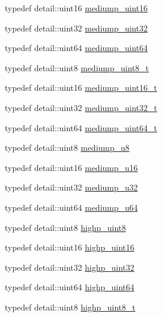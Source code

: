 \begin{DoxyCompactItemize}
typedef detail\+::uint16 \hyperlink{group__gtc__type__precision_ga2cef3a0d7b0fce75c9885f64656d8933}{mediump\+\_\+uint16}
\item 
typedef detail\+::uint32 \hyperlink{group__gtc__type__precision_ga861dbd1051f488e425b3966001b568e5}{mediump\+\_\+uint32}
\item 
typedef detail\+::uint64 \hyperlink{group__gtc__type__precision_ga6685788d15d0a973ee7c2460d0456dc1}{mediump\+\_\+uint64}
\item 
typedef detail\+::uint8 \hyperlink{group__gtc__type__precision_gadfa38f3c245d371c4b2079f1fd68928b}{mediump\+\_\+uint8\+\_\+t}
\item 
typedef detail\+::uint16 \hyperlink{group__gtc__type__precision_ga0b385466deac5ac96061ef2cdd6db20f}{mediump\+\_\+uint16\+\_\+t}
\item 
typedef detail\+::uint32 \hyperlink{group__gtc__type__precision_gac7782c1e393f9ad47e41a177a685f287}{mediump\+\_\+uint32\+\_\+t}
\item 
typedef detail\+::uint64 \hyperlink{group__gtc__type__precision_gaa97354d3120a6dc029a5e9563723de18}{mediump\+\_\+uint64\+\_\+t}
\item 
typedef detail\+::uint8 \hyperlink{group__gtc__type__precision_gac04b372784392e82bd557f300c4de097}{mediump\+\_\+u8}
\item 
typedef detail\+::uint16 \hyperlink{group__gtc__type__precision_ga6745262ef6a6fdb8637b2387ef924828}{mediump\+\_\+u16}
\item 
typedef detail\+::uint32 \hyperlink{group__gtc__type__precision_gad0c27a525045c299a92306eb4cd7c13a}{mediump\+\_\+u32}
\item 
typedef detail\+::uint64 \hyperlink{group__gtc__type__precision_ga00c51a16fa190b0a90205d50d6d8a44a}{mediump\+\_\+u64}
\item 
typedef detail\+::uint8 \hyperlink{group__gtc__type__precision_ga2c27c6dd26e893786f04b10f99c1ee95}{highp\+\_\+uint8}
\item 
typedef detail\+::uint16 \hyperlink{group__gtc__type__precision_ga4d32967d45ba8365e2a05eaaac85e978}{highp\+\_\+uint16}
\item 
typedef detail\+::uint32 \hyperlink{group__gtc__type__precision_ga3145e44c73e2df7dfe4f3cb65974bf22}{highp\+\_\+uint32}
\item 
typedef detail\+::uint64 \hyperlink{group__gtc__type__precision_ga8079c653e20cda03d34b99de629a7b09}{highp\+\_\+uint64}
\item 
typedef detail\+::uint8 \hyperlink{group__gtc__type__precision_ga9ba529fcc75b82d23da979f0ce6e4518}{highp\+\_\+uint8\+\_\+t}

\end{DoxyCompactItemize}
